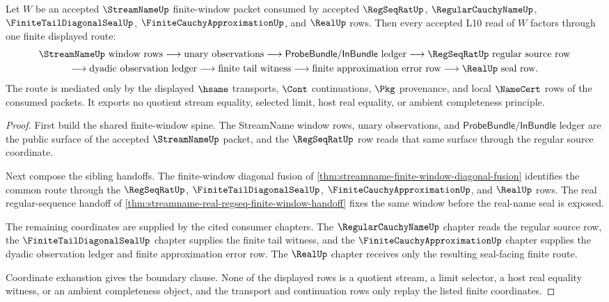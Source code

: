 \begin{theorem}
\label{thm:streamname-l10-gateway-factorization}
Let $W$ be an accepted $\StreamNameUp$ finite-window packet consumed by accepted $\RegSeqRatUp$, $\RegularCauchyNameUp$, $\FiniteTailDiagonalSealUp$, $\FiniteCauchyApproximationUp$, and $\RealUp$ rows. Then every accepted L10 read of $W$ factors through one finite displayed route:
$$
\begin{gathered}
\text{$\StreamNameUp$ window rows}
\longrightarrow
\text{unary observations}
\longrightarrow
\text{$\mathsf{ProbeBundle}/\mathsf{InBundle}$ ledger}
\longrightarrow
\text{$\RegSeqRatUp$ regular source row}
\\
\longrightarrow
\text{dyadic observation ledger}
\longrightarrow
\text{finite tail witness}
\longrightarrow
\text{finite approximation error row}
\longrightarrow
\text{$\RealUp$ seal row.}
\end{gathered}
$$
The route is mediated only by the displayed $\hsame$ transports, $\Cont$ continuations, $\Pkg$ provenance, and local $\NameCert$ rows of the consumed packets. It exports no quotient stream equality, selected limit, host real equality, or ambient completeness principle.
\end{theorem}
\begin{proof}
First build the shared finite-window spine. The StreamName window rows, unary observations, and $\mathsf{ProbeBundle}/\mathsf{InBundle}$ ledger are the public surface of the accepted $\StreamNameUp$ packet, and the $\RegSeqRatUp$ row reads that same surface through the regular source coordinate.

Next compose the sibling handoffs. The finite-window diagonal fusion of \autoref{thm:streamname-finite-window-diagonal-fusion} identifies the common route through the $\RegSeqRatUp$, $\FiniteTailDiagonalSealUp$, $\FiniteCauchyApproximationUp$, and $\RealUp$ rows. The real regular-sequence handoff of \autoref{thm:streamname-real-regseq-finite-window-handoff} fixes the same window before the real-name seal is exposed.

The remaining coordinates are supplied by the cited consumer chapters. The $\RegularCauchyNameUp$ chapter reads the regular source row, the $\FiniteTailDiagonalSealUp$ chapter supplies the finite tail witness, and the $\FiniteCauchyApproximationUp$ chapter supplies the dyadic observation ledger and finite approximation error row. The $\RealUp$ chapter receives only the resulting seal-facing finite route.

Coordinate exhaustion gives the boundary clause. None of the displayed rows is a quotient stream, a limit selector, a host real equality witness, or an ambient completeness object, and the transport and continuation rows only replay the listed finite coordinates.
\end{proof}

